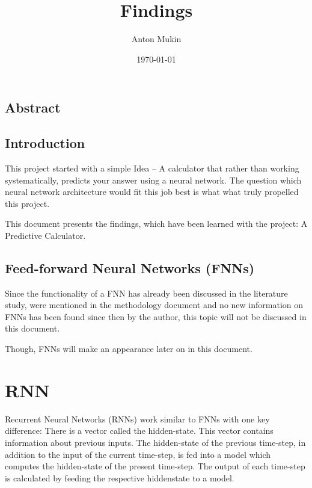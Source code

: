 \documentclass{article}
\title{Findings}
\author{Anton Mukin}
\date{\today}
\begin{document}
\maketitle

\subsection{Abstract}

\subsection{Introduction}
This project started with a simple Idea -- A calculator that rather than 
working systematically, predicts your answer using a neural network. The 
question which neural network architecture would fit this job best is what 
what truly propelled this project.

This document presents the findings, which have been learned with the 
project: A Predictive Calculator.

\subsection{Feed-forward Neural Networks (FNNs)}
Since the functionality of a FNN has already been discussed in the 
literature study, were mentioned in the methodology document and no new 
information on FNNs has been found since then by the author, this topic 
will not be discussed in this document. 

Though, FNNs will make an appearance later on in this document.

\newpage
\tableofcontents
\newpage

\section{RNN}

Recurrent Neural Networks (RNNs) work similar to FNNs with one key 
difference: There is a vector called the hidden-state. This vector contains 
information about previous inputs. The hidden-state of the previous 
time-step, in addition to the input of the current time-step, is fed into a 
model which computes the hidden-state of the present time-step. The output 
of each time-step is calculated by feeding the respective hiddenstate to a 
model.
\end{document}
